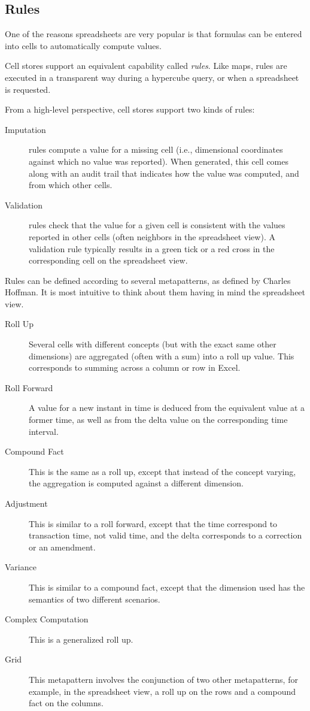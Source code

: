 \documentclass{acm_proc_article-sp}
\begin{document}
\subsection{Rules}

One of the reasons spreadsheets are very popular is that formulas can be entered into cells to automatically compute values.

Cell stores support an equivalent capability called \emph{rules}. Like maps, rules are executed in a transparent way during a hypercube query, or when a spreadsheet is requested.

From a high-level perspective, cell stores support two kinds of rules:

\vspace{-\topsep}
\begin{description}
\item[Imputation] rules compute a value for a missing cell (i.e., dimensional coordinates against which no value was reported). When generated, this cell comes along with an audit trail that indicates how the value was computed, and from which other cells.
\item[Validation] rules check that the value for a given cell is consistent with the values reported in other cells (often neighbors in the spreadsheet view). A validation rule typically results in a green tick or a red cross in the corresponding cell on the spreadsheet view.
\end{description}

Rules can be defined according to several metapatterns, as defined by Charles Hoffman. It is most intuitive to think about them having in mind the spreadsheet view.

\vspace{-\topsep}
\begin{description}
\item [Roll Up] Several cells with different concepts (but with the exact same other dimensions) are aggregated (often with a sum) into a roll up value. This corresponds to summing across a column or row in Excel.
\item [Roll Forward] A value for a new instant in time is deduced from the equivalent value at a former time, as well as from the delta value on the corresponding time interval.
\item [Compound Fact] This is the same as a roll up, except that instead of the concept varying, the aggregation is computed against a different dimension.
\item [Adjustment] This is similar to a roll forward, except that the time correspond to transaction time, not valid time, and the delta corresponds to a correction or an amendment.
\item [Variance] This is similar to a compound fact, except that the dimension used has the semantics of two different scenarios.
\item [Complex Computation] This is a generalized roll up.
\item [Grid] This metapattern involves the conjunction of two other metapatterns, for example, in the spreadsheet view, a roll up on the rows and a compound fact on the columns.
\end{description}
\end{document}
